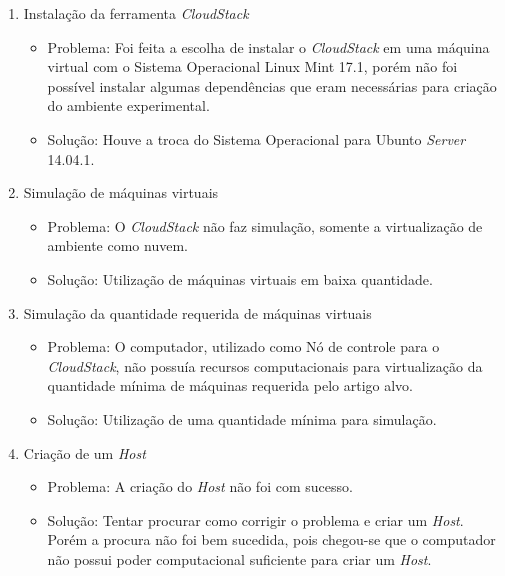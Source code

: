   \begin{enumerate}

    \item Instalação da ferramenta \textit{CloudStack}

    \begin{itemize}
      \item Problema: Foi feita a escolha de instalar o \textit{CloudStack} em uma máquina virtual com o Sistema Operacional Linux Mint 17.1, porém não foi possível instalar algumas dependências que eram necessárias para criação do ambiente experimental.
      \item Solução: Houve a troca do Sistema Operacional para Ubunto \textit{Server} 14.04.1.
    \end{itemize}

    \item Simulação de máquinas virtuais
    \begin{itemize}
      \item Problema: O \textit{CloudStack} não faz simulação, somente a virtualização de ambiente como nuvem.
      \item Solução: Utilização de máquinas virtuais em baixa quantidade.
    \end{itemize}

    \item Simulação da quantidade requerida de máquinas virtuais
    \begin{itemize}
      \item Problema: O computador, utilizado como Nó de controle para o \textit{CloudStack}, não possuía recursos computacionais para virtualização da quantidade mínima de máquinas requerida pelo artigo alvo.
      \item Solução: Utilização de uma quantidade mínima para simulação.
    \end{itemize}

    \item Criação de um \textit{Host}
    \begin{itemize}
      \item Problema: A criação do \textit{Host} não foi com sucesso.
      \item Solução: Tentar procurar como corrigir o problema e criar um \textit{Host}. Porém a procura não foi bem sucedida, pois chegou-se que o computador não possui poder computacional suficiente para criar um \textit{Host}.
    \end{itemize}

  \end{enumerate}


  \begin{comment}

    \item Instalação da ferramenta CloudStack
    \begin{itemize}
      \item Problema:
      \item Solução:
    \end{itemize}


  \end{comment}
